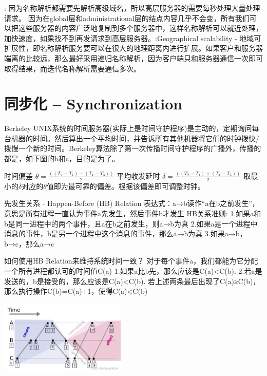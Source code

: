 \documentclass[twoside]{ctexart}
\begin{document}
\begin{multicols}{2}
   : 因为名称解析都需要先解析高级域名，所以高层服务器的需要每秒处理大量处理请求。  因为在global层和administrational层的结点内容几乎不会变，所有我们可以把这些服务器的内容广泛地复制到多个服务器中，这样名称解析可以就近处理，加快速度，如果找不到再发请求到高层服务器。:Geographical scalability - 地域可扩展性，即名称解析服务要可以在很大的地理距离内进行扩展。如果客户和服务器端离的比较远，那么最好采用递归名称解析，因为客户端只和服务器通信一次即可取得结果，而迭代名称解析需要通信多次。

  \section{同步化 -- Synchronization}   Berkeley UNIX系统的时间服务器(实际上是时间守护程序)是主动的，定期询问每台机器的时间。然后算出一个平均时间，并告诉所有其他机器将它们的时钟拨快/拨慢一个新的时间。Berkeley算法除了第一次传播时间守护程序的广播外，传播的都是，如下图的b和c，目的是为了。 

   时间偏差 $ θ=\frac{((T_2-T_1 )-(T_4-T_3))}{2} $ 平均收发延时 $ δ=\frac{((T_2-T_1 )+(T_4-T_3))}{2} $ 取最小的$δ$对应的$θ$值即为最可靠的偏差。根据该偏差即可调整时钟。
  
    先发生关系 - Happen-Before (HB) Relation 表达式：a→b读作``a在b之前发生''，意思是所有进程一直认为事件a先发生，然后事件b才发生 HB关系准则: 1.如果a和b是同一进程中的两个事件，且a在b之前发生，则a\emph{→}b为真 2.如果a是一个进程中消息的事件，b是另一个进程中这个消息的事件，那么a\emph{→}b为真 3.如果a→b，b→c，那么a→c

  如何使用HB Relation来维持系统时间一致？ 对于每个事件a，我们都能为它分配一个所有进程都认可的时间值C(a) 1.如果a比b先，那么应该是C(a)\textless C(b). 2.若a是发送的，b是接受的，那么应该是C(a)\textless C(b). 若上述两条最后出现了C(a)≥C(b)，那么执行操作C(b)=C(a)+1，使得C(a)\textless C(b)  

\includegraphics[width=0.45\textwidth,keepaspectratio]{pics/lamport.png}


\end{multicols}
\end{document}
